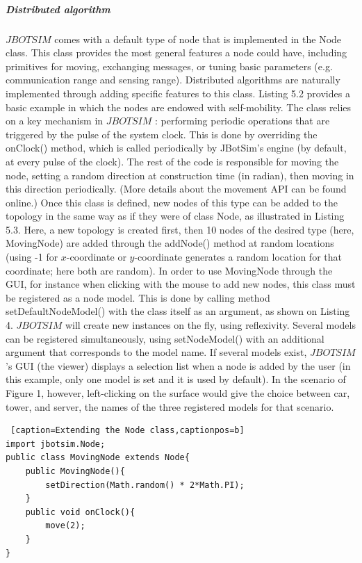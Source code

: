 \subparagraph{Distributed algorithm} $JBOTSIM$  comes with a default type of node that is implemented in the Node class. This class provides the most general features a node could have, including primitives for moving, exchanging messages, or tuning basic parameters (e.g. communication range and sensing range). Distributed algorithms are naturally implemented through adding specific features to this class. Listing 5.2 provides a basic example in which the nodes are endowed with self-mobility. The class relies on a key mechanism in  $JBOTSIM$ : performing periodic operations that are triggered by the pulse of the system clock. This is done by overriding the onClock() method, which is called periodically by JBotSim’s engine (by default, at every pulse of the clock). The rest of the code is responsible for moving the node, setting a random direction at construction time (in radian), then moving in this direction periodically. (More details about the movement API can be found online.) Once this class is defined, new nodes of this type can be added to the topology in the same way as if they were of class Node, as illustrated in Listing 5.3. Here, a new topology is created first, then 10 nodes of the desired type (here, MovingNode) are added through the addNode() method at random locations (using -1 for $x$-coordinate or $y$-coordinate generates a random location for that coordinate; here both are random). In order to use MovingNode through the GUI, for instance when clicking with the mouse to add new nodes, this class must be registered as a node model. This is done by calling method setDefaultNodeModel() with the class itself as an argument, as shown on Listing 4. $JBOTSIM$ will create new instances on the fly, using reflexivity. Several models can be registered simultaneously, using setNodeModel() with an additional argument that corresponds to the model name. If several models exist,  $JBOTSIM$ ’s GUI (the viewer) displays a selection list when a node is added by the user (in this example, only one model is set and it is used by default). In the scenario of Figure 1, however, left-clicking on the surface would give the choice between car, tower, and server, the names of the three registered models for that scenario.
\begin{lstlisting} [caption=Extending the Node class,captionpos=b]
import jbotsim.Node;
public class MovingNode extends Node{
	public MovingNode(){
		setDirection(Math.random() * 2*Math.PI);
	}
	public void onClock(){
		move(2);
	}
}
\end{lstlisting}

